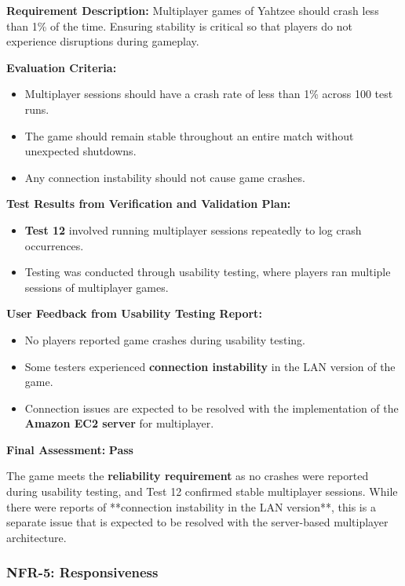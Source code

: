 \documentclass[12pt, titlepage]{article}
\begin{document}
\textbf{Requirement Description:}  
Multiplayer games of Yahtzee should crash less than 1\% of the time. Ensuring stability is critical so that players do not experience disruptions during gameplay.

\textbf{Evaluation Criteria:}  
\begin{itemize}
    \item Multiplayer sessions should have a crash rate of less than 1\% across 100 test runs.
    \item The game should remain stable throughout an entire match without unexpected shutdowns.
    \item Any connection instability should not cause game crashes.
\end{itemize}

\textbf{Test Results from Verification and Validation Plan:}  
\begin{itemize}
    \item \textbf{Test 12} involved running multiplayer sessions repeatedly to log crash occurrences.
    \item Testing was conducted through usability testing, where players ran multiple sessions of multiplayer games.
\end{itemize}

\textbf{User Feedback from Usability Testing Report:}  
\begin{itemize}
    \item No players reported game crashes during usability testing.
    \item Some testers experienced \textbf{connection instability} in the LAN version of the game.
    \item Connection issues are expected to be resolved with the implementation of the \textbf{Amazon EC2 server} for multiplayer.
\end{itemize}

\textbf{Final Assessment:} \textbf{Pass}  

The game meets the \textbf{reliability requirement} as no crashes were reported during usability testing, and Test 12 confirmed stable multiplayer sessions. While there were reports of **connection instability in the LAN version**, this is a separate issue that is expected to be resolved with the server-based multiplayer architecture.


\subsubsection{NFR-5: Responsiveness}
\label{NFR5}
\end{document}
